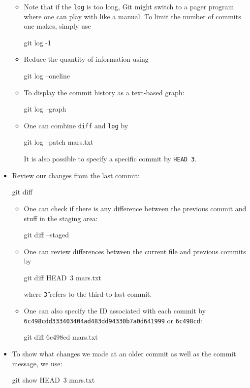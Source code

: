 \documentclass[UTF8]{book}
\newcommand{\code}[1]{\colorbox{codegray}{\texttt{#1}}}
\begin{document}
\begin{itemize}
\begin{itemize}
	\item Note that if the \code{log} is too long, Git might switch to a pager program where one can play with like a manual. To limit the number of commits one makes, simply use
\begin{bash}
git log -1
\end{bash}
	\item Reduce the quantity of information using
\begin{bash}
git log --oneline
\end{bash}
	\item To display the commit history as a text-based graph:
\begin{bash}
git log --graph
\end{bash}
	\item One can combine \code{diff} and \code{log} by
\begin{bash}
git log --patch mars.txt
\end{bash}
It is also possible to specify a specific commit by \code{HEAD~3}.
\end{itemize}
\item Review our changes from the last commit:
\begin{bash}
git diff
\end{bash}
\begin{itemize}
	\item One can check if there is any difference between the previous commit and stuff in the staging area:
\begin{bash}
git diff --staged
\end{bash}
	\item One can review differences between the current file and previous commits by
\begin{bash}
git diff HEAD~3 mars.txt
\end{bash}
where \code{\~3} refers to the third-to-last commit.
	\item One can also specify the ID associated with each commit by \code{6c498cdd333403404ad483dd94330b7a0d641999} or \code{6c498cd}:
\begin{bash}
git diff 6c498cd mars.txt
\end{bash}
\end{itemize}
\item To show what changes we made at an older commit as well as the commit message, we use:
\begin{bash}
git show HEAD~3 mars.txt
\end{bash}

\end{itemize}
\end{document}
